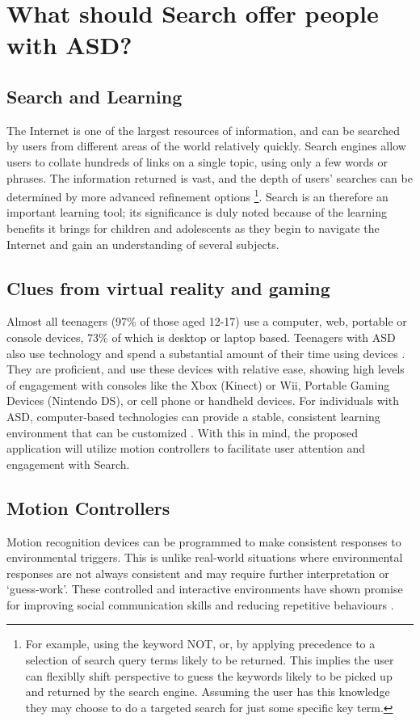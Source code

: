 \documentclass[10pt]{article}
\begin{document}
\section{What should Search offer people with ASD?}\label{What should Search offer people with ASD}
\subsection{Search and Learning}
The Internet is one of the largest resources of information, and can be searched by users from different areas of the world relatively quickly. Search engines allow users to collate hundreds of links on a single topic, using only a few words or phrases. The information returned is vast, and the depth of users’ searches can be determined by more advanced refinement options \footnote{For example, using the keyword NOT, or, by applying precedence to a selection of search query terms likely to be returned. This implies the user can flexiblly shift perspective to guess the keywords likely to be picked up and returned by the search engine. Assuming the user has this knowledge they may choose to do a targeted search for just some specific key term.}. Search is an therefore an important learning tool; its significance is duly noted because of the learning benefits it brings for children and adolescents as they begin to navigate the Internet and gain an understanding of several subjects. 

\subsection{Clues from virtual reality and gaming}
Almost all teenagers (97\% of those aged 12-17) use a computer, web, portable or console devices, 73\% of which is desktop or laptop based. Teenagers with ASD also use technology and spend a substantial amount of their time using devices \cite{Shane and Albert}. They are proficient, and use these devices with relative ease, showing high levels of engagement with consoles like the Xbox (Kinect) or Wii, Portable Gaming Devices (Nintendo DS), or cell phone or handheld devices. For individuals with ASD, computer-based technologies can provide a stable, consistent learning environment that can be customized \cite{moore}. With this in mind, the proposed application will utilize motion controllers to facilitate user attention and engagement with Search. 

\subsection{Motion Controllers}
Motion recognition devices can be programmed to make consistent responses to environmental triggers. This is unlike real-world situations where environmental responses are not always consistent and may require further interpretation or ‘guess-work’. These controlled and interactive environments have shown promise for improving social communication skills and reducing repetitive behaviours \cite{gameshealth}.
\end{document}
